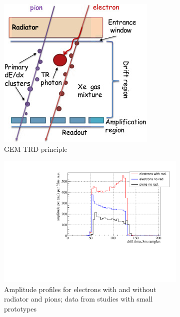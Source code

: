 \documentclass[%
preprint,
nofootinbib,
 amsmath,amssymb,
 aps,
floatfix,
]{revtex4-1}
\begin{document}
\begin{figure}[h]
  \begin{subfigure}[b]{0.40\textwidth}
    \includegraphics[width=\textwidth]{./fig/GEM_TRD_principle.jpg}
    \caption{GEM-TRD principle}
    \label{fig:principle}
  \end{subfigure}
  \begin{subfigure}[b]{0.49\textwidth}
    \includegraphics[width=\textwidth]{./fig/GEMTRD_piel_ampl_vs_t_left-2142.pdf}
    \caption{Amplitude profiles for electrons with and without radiator and pions;
data from studies with small prototypes}
    \label{fig:profile}
  \end{subfigure}
  \caption{
}
  \label{fig:BH_pove_pi}
\end{figure}
\end{document}

